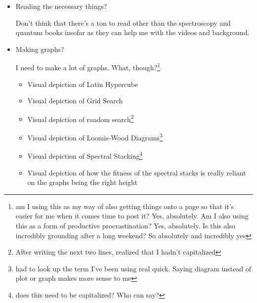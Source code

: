 \documentclass[12pt]{article}
\newcommand{\say}[1]{``#1''}
\renewcommand{\,}{\textsuperscript{,}}
\begin{document}
\begin{enumerate}
\begin{itemize}
\begin{itemize}
\begin{itemize}
\item RebelFit Results Thesis Chapter Draft. Internal/nominal due date: Friday 5/9.

\item I guess that I should probably also put here: \say{Do the background species subtraction and resubmit those jobs}, which I will nominally deadline at tomorrow, 5/6, because I think that I should do that today.\footnote{time for a post it}

\item Introduction to Spectroscopy, especially rotational spectroscopy, both as classical and quantum framed. Let's say due 5/7.

\end{itemize}

\item Reading the necessary things?

Don't think that there's a ton to read other than the spectroscopy and quantum books insofar as they can help me with the videos and background.

\item Making graphs?

I need to make a lot of graphs.  
What, though?\footnote{am I using this as my way of also getting things onto a page so that it's easier for me when it comes time to post it? Yes, absolutely. Am I also using this as a form of productive procrastination? Yes, absolutely. Is this also incredibly grounding after a long weekend? So absolutely and incredibly yes}

\begin{itemize}

\item Visual depiction of Latin Hypercube

\item Visual depiction of Grid Search

\item Visual depiction of random search\footnote{After writing the next two lines, realized that I hadn't capitalized}

\item Visual depiction of Loomis-Wood Diagrams\footnote{had to look up the term I've been using real quick. Saying diagram instead of plot or graph makes more sense to me}

\item Visual depiction of Spectral Stacking\footnote{does this need to be capitalized? Who can say?}

\item Visual depiction of how the fitness of the spectral stacks is really reliant on the graphs being the right height


\end{itemize}
\end{itemize}
\end{itemize}
\end{enumerate}
\end{document}
